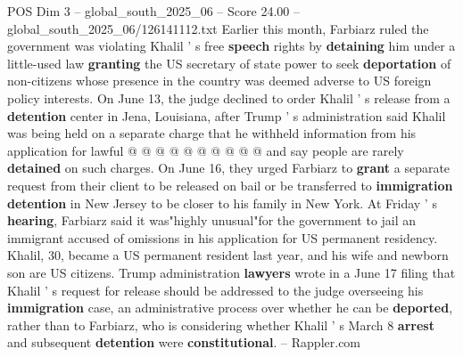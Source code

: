 \begin{textsample}{POS Dim 3 – global\_south\_2025\_06 – Score 24.00 – global\_south\_2025\_06/126141112.txt}
Earlier this month, Farbiarz ruled the government was violating Khalil ' s free \textbf{speech} rights by \textbf{detaining} him under a little-used law \textbf{granting} the US secretary of state power to seek \textbf{deportation} of non-citizens whose presence in the country was deemed adverse to US foreign policy interests.
On June 13, the judge declined to order Khalil ' s release from a \textbf{detention} center in Jena, Louisiana, after Trump ' s administration said Khalil was being held on a separate charge that he withheld information from his application for lawful @ @ @ @ @ @ @ @ @ @ and say people are rarely \textbf{detained} on such charges.
On June 16, they urged Farbiarz to \textbf{grant} a separate request from their client to be released on bail or be transferred to \textbf{immigration} \textbf{detention} in New Jersey to be closer to his family in New York.
At Friday ' s \textbf{hearing}, Farbiarz said it was"highly unusual"for the government to jail an immigrant accused of omissions in his application for US permanent residency.
Khalil, 30, became a US permanent resident last year, and his wife and newborn son are US citizens.
Trump administration \textbf{lawyers} wrote in a June 17 filing that Khalil ' s request for release should be addressed to the judge overseeing his \textbf{immigration} case, an administrative process over whether he can be \textbf{deported}, rather than to Farbiarz, who is considering whether Khalil ' s March 8 \textbf{arrest} and subsequent \textbf{detention} were \textbf{constitutional}. -- Rappler.com

\end{textsample}

